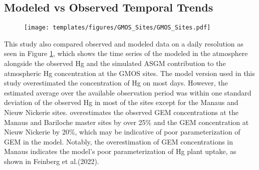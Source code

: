 
\subsection{Modeled vs Observed Temporal Trends}
\begin{figure}[H]
\texttt{[image: templates/figures/GMOS\_Sites/GMOS\_Sites.pdf]}
\centering
{}
\label{fig:GMOSvsGC}
\end{figure}
\FloatBarrier


\begin{flushleft}


 This study also compared observed and modeled data on a daily resolution as seen in Figure \ref{fig:GMOSvsGC}, which shows the time series of the modeled \hgc in the atmosphere alongside the observed Hg and the simulated ASGM contribution to the atmospheric Hg concentration at the GMOS sites. The \gc model version used in this study overestimated the concentration of Hg on most days. However, the \gc estimated average \hgc over the available observation period was within one standard deviation of the observed Hg in most of the sites except for the Manaus and Nieuw Nickerie sites. \gcs overestimates the observed GEM concentrations at the Manaus and Bariloche master sites by over 25\%  and the GEM concentration at Nieuw Nickerie by 20\%, which may be indicative of poor parameterization of GEM in the model. Notably, the overestimation of GEM concentrations in Manaus indicates the model's poor parameterization of Hg plant uptake, as shown in Feinberg et al.(2022)\cite{feinberg_evaluating_2022}.
\end{flushleft}


